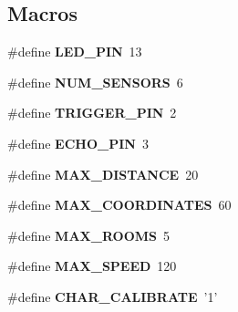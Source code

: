 \subsection*{Macros}
\begin{DoxyCompactItemize}
\item 
\hypertarget{robotcode_8ino_ab4553be4db9860d940f81d7447173b2f}{\#define {\bfseries L\+E\+D\+\_\+\+P\+I\+N}~13}\label{robotcode_8ino_ab4553be4db9860d940f81d7447173b2f}

\item 
\hypertarget{robotcode_8ino_add02d1c189e3b727b722638327642a8b}{\#define {\bfseries N\+U\+M\+\_\+\+S\+E\+N\+S\+O\+R\+S}~6}\label{robotcode_8ino_add02d1c189e3b727b722638327642a8b}

\item 
\hypertarget{robotcode_8ino_adacee581176b7076b7baf0f72d81460f}{\#define {\bfseries T\+R\+I\+G\+G\+E\+R\+\_\+\+P\+I\+N}~2}\label{robotcode_8ino_adacee581176b7076b7baf0f72d81460f}

\item 
\hypertarget{robotcode_8ino_acea96cea4a13b6cb38e57a86788adf90}{\#define {\bfseries E\+C\+H\+O\+\_\+\+P\+I\+N}~3}\label{robotcode_8ino_acea96cea4a13b6cb38e57a86788adf90}

\item 
\hypertarget{robotcode_8ino_a08e4da5f3d0c7936fa52467f40e4b6aa}{\#define {\bfseries M\+A\+X\+\_\+\+D\+I\+S\+T\+A\+N\+C\+E}~20}\label{robotcode_8ino_a08e4da5f3d0c7936fa52467f40e4b6aa}

\item 
\hypertarget{robotcode_8ino_a8c43ff28382fa323973c476e7587b27f}{\#define {\bfseries M\+A\+X\+\_\+\+C\+O\+O\+R\+D\+I\+N\+A\+T\+E\+S}~60}\label{robotcode_8ino_a8c43ff28382fa323973c476e7587b27f}

\item 
\hypertarget{robotcode_8ino_a251d94cd24a2ca3369fc3f8eca8c19ae}{\#define {\bfseries M\+A\+X\+\_\+\+R\+O\+O\+M\+S}~5}\label{robotcode_8ino_a251d94cd24a2ca3369fc3f8eca8c19ae}

\item 
\hypertarget{robotcode_8ino_ac2cd96d53dd3ba6407db6766c3d92b26}{\#define {\bfseries M\+A\+X\+\_\+\+S\+P\+E\+E\+D}~120}\label{robotcode_8ino_ac2cd96d53dd3ba6407db6766c3d92b26}

\item 
\hypertarget{robotcode_8ino_acff0705eddd3534f7287eccf7bae20bb}{\#define {\bfseries C\+H\+A\+R\+\_\+\+C\+A\+L\+I\+B\+R\+A\+T\+E}~'1'}\label{robotcode_8ino_acff0705eddd3534f7287eccf7bae20bb}


\end{DoxyCompactItemize}
